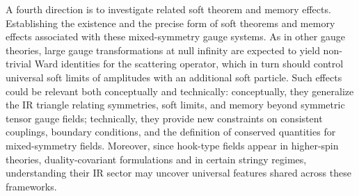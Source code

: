 \documentclass[a4paper,12pt]{article}
\begin{document}
A fourth direction is to investigate related soft theorem and memory effects. Establishing the existence and the precise form of soft theorems and memory effects associated with these mixed-symmetry gauge systems. As in other gauge theories, large gauge transformations at null infinity are expected to yield non-trivial Ward identities for the scattering operator, which in turn should control universal soft limits of amplitudes with an additional soft particle. Such effects could be relevant both conceptually and technically: conceptually, they generalize the IR triangle relating symmetries, soft limits, and memory beyond symmetric tensor gauge fields; technically, they provide new constraints on consistent couplings, boundary conditions, and the definition of conserved quantities for mixed-symmetry fields. Moreover, since hook-type fields appear in higher-spin theories, duality-covariant formulations and in certain stringy regimes, understanding their IR sector may uncover universal features shared across these frameworks.

\appendix
\end{document}
